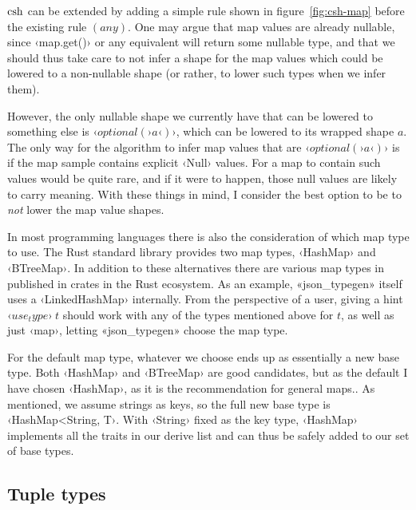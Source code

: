 $\operatorname{csh}$ can be extended by adding a simple rule shown in figure~\ref{fig:csh-map} before the existing rule $(any)$. One may argue that map values are already nullable, since ‹map.get()› or any equivalent will return some nullable type, and that we should thus take care to not infer a shape for the map values which could be lowered to a non-nullable shape (or rather, to lower such types when we infer them).

However, the only nullable shape we currently have that can be lowered to something else is $‹optional(›a‹)›$, which can be lowered to its wrapped shape $a$. The only way for the algorithm to infer map values that are $‹optional(›a‹)›$ is if the map sample contains explicit ‹Null› values. For a map to contain such values would be quite rare, and if it were to happen, those null values are likely to carry meaning. With these things in mind, I consider the best option to be to \emph{not} lower the map value shapes.

In most programming languages there is also the consideration of which map type to use. The Rust standard library provides two map types, ‹HashMap› and ‹BTreeMap›. In addition to these alternatives there are various map types in published in crates in the Rust ecosystem. As an example, «json_typegen» itself uses a ‹LinkedHashMap› internally. From the perspective of a user, giving a hint $‹use_type›\ t$ should work with any of the types mentioned above for $t$, as well as just ‹map›, letting «json_typegen» choose the map type.

For the default map type, whatever we choose ends up as essentially a new base type. Both ‹HashMap› and ‹BTreeMap› are good candidates, but as the default I have chosen ‹HashMap›, as it is the recommendation for general maps.\cite[std::collections]{rust-std-docs}. As mentioned, we assume strings as keys, so the full new base type is ‹HashMap<String, T›. With ‹String› fixed as the key type, ‹HashMap› implements all the traits in our derive list and can thus be safely added to our set of base types.



\subsection{Tuple types}
\label{sec:ext-tuples}

